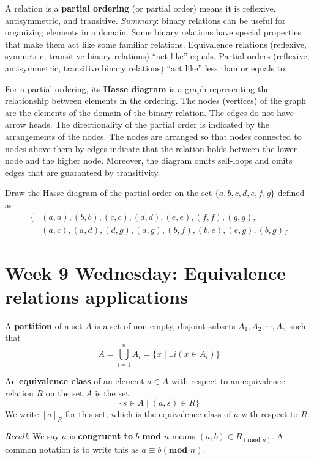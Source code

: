 \documentclass[12pt, oneside]{article}
\begin{document}
A relation is a {\bf partial ordering} (or partial order) means 
it is reflexive, antisymmetric, and transitive. {\it Summary}: binary relations can be useful for organizing elements in a domain. 
Some binary relations have special properties that make them act like some familiar relations.
Equivalence relations (reflexive, symmetric, transitive binary relations) ``act like'' equals.
Partial orders (reflexive, antisymmetric, transitive binary relations) ``act like'' less than or equals to.


For a partial ordering, its {\bf Hasse diagram} is a graph representing the 
relationship between elements in the ordering. The nodes (vertices) of the graph 
are the elements of the 
domain of the binary relation. The edges do not have arrow heads. The
directionality of the partial order is indicated by 
the arrangements of the nodes. The nodes are arranged so that nodes connected to nodes
above them by edges indicate that the relation holds between the 
lower node and the higher node. 
Moreover, the diagram omits self-loops and 
omits edges that are guaranteed by transitivity.
 \vfill


Draw the Hasse diagram of the partial order on the set $\{a,b,c,d,e,f,g\}$ defined as
\begin{align*}
    \{  &(a,a), (b,b), (c,c), (d,d), (e,e), (f,f), (g,g), \\
        &(a,c), (a,d), (d,g), (a,g), (b,f), (b,e), (e,g), (b,g) \}
\end{align*}

\vspace{100pt}

%
 \vfill
\newpage
\section*{Week 9 Wednesday: Equivalence relations applications}


A {\bf partition} of a set $A$ is a set of non-empty, disjoint subsets 
$A_1, A_2, \cdots, A_n$ such that 
\[
    A = \bigcup_{i=1}^{n} A_i = \{ x \mid \exists i (x \in A_i) \}
\] 

An {\bf equivalence class} of an element $a \in A$ 
with respect to an equivalence relation $R$ on the set $A$ is the set 
\[
    \{s \in A \mid (a, s) \in R \}
\] 
We write $[a]_R$ for this set, which is the equivalence class of $a$ with respect to $R$. 

{\it Recall}: We say $a$ is {\bf congruent to} $b$ \textbf{mod} $n$ 
means $(a, b) \in R_{(\textbf{mod } n)}$. 
A common notation is to write this as $a \equiv b (\textbf{mod } n)$.
\end{document}
